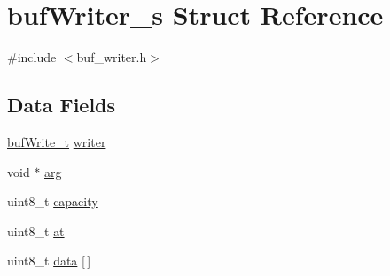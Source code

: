 \hypertarget{structbufWriter__s}{\section{buf\+Writer\+\_\+s Struct Reference}
\label{structbufWriter__s}
}


{\ttfamily \#include $<$buf\+\_\+writer.\+h$>$}

\subsection*{Data Fields}
\begin{DoxyCompactItemize}
\item 
\hyperlink{buf__writer_8h_ab59fe6deb6f3766ed2f806262d0b6d76}{buf\+Write\+\_\+t} \hyperlink{structbufWriter__s_a0b417f5f34355bd86ba69cbb42fd617a}{writer}
\item 
void $\ast$ \hyperlink{structbufWriter__s_a41345b2ba5d918d545528517839d5f1f}{arg}
\item 
uint8\+\_\+t \hyperlink{structbufWriter__s_a2e89a9f093be06d8c3173ecf432f7fd4}{capacity}
\item 
uint8\+\_\+t \hyperlink{structbufWriter__s_af913c60f0c740cd94f448c5da97443a6}{at}
\item 
uint8\+\_\+t \hyperlink{structbufWriter__s_ad3753314bf3f04462e55533f6fbfc8f3}{data} \mbox{[}$\,$\mbox{]}
\end{DoxyCompactItemize}


